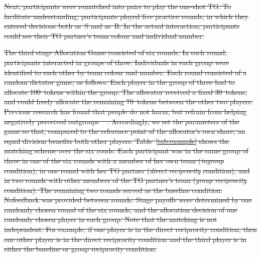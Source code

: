 \documentclass[12pt,a4paper]{article}
\providecommand{\DIFdeltex}[1]{{\protect\color{red}\sout{#1}}}                      %
\providecommand{\DIFdel}[1]{\texorpdfstring{\DIFdeltex{#1}}{}} %
\begin{document}
\DIFdel{Next, participants were rematched into pairs to play the one-shot
TG. To facilitate understanding, participants played five practice
rounds, in which they entered decisions both as~S and as~R. In the
actual interaction, participants could see their TG partner's team
colour and individual number. 
}%

\DIFdel{The third stage Allocation Game consisted of six rounds. In each round, participants interacted
in groups of three. Individuals in each group were identified to each other by
team colour and number. Each round consisted of a random dictator game, as
follows. Each player in the group of three had to allocate 100~tokens within the
group. The allocator received a fixed 30~tokens, and could freely allocate the
remaining 70~tokens between the other two players. Previous research has found that
people do not harm, but refrain from helping negatively perceived outgroups
\mbox{%
\citep{weisel2015ingroup}}%
. Accordingly, we set the parameters of the game so
that, compared to the reference point of the allocator's own share, an equal
division benefits both other players. Table~\ref{tab:example} shows the matching scheme over the six rouds. Each participant was in the same group of three in one of the six rounds with a
member of her own team (}\emph{\DIFdel{ingroup}} %
\DIFdel{condition), in one round with her TG partner
(}\emph{\DIFdel{direct reciprocity}} %
\DIFdel{condition), and in two rounds with other members of the TG
partner's team (}\emph{\DIFdel{group reciprocity}} %
\DIFdel{condition). The remaining two rounds
served as the baseline condition. Nofeedback was provided between rounds. Stage payoffs were determined by one randomly chosen round of the six rounds, and
the allocation decision of one randomly chosen player in each group. Note that the matching is not independent. For example, if one player is in the direct reciprocity condition, then one other player
is in the direct reciprocity condition and the third player is in either the baseline or group
reciprocity condition. 
}%
\end{document}
